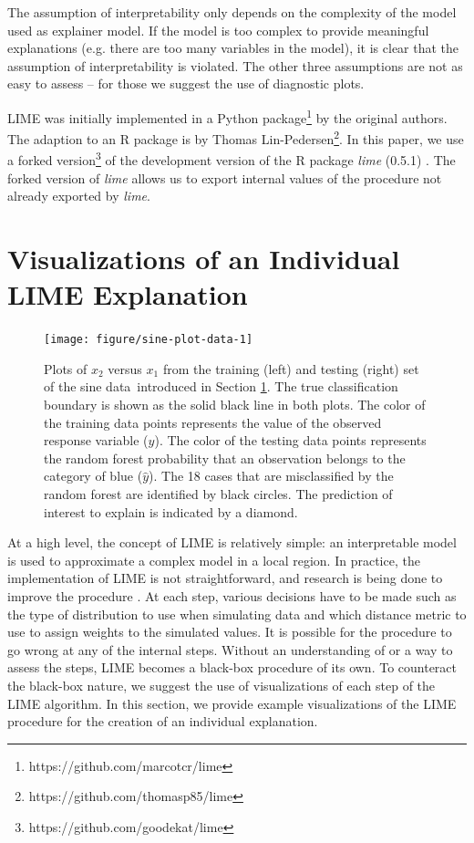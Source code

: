 \documentclass[AMS,STIX2COL]{WileyNJD-v2}\usepackage[]{graphicx}\usepackage[]{color}
\newenvironment{knitrout}{}{} %
\newcommand{\data}{sine data}
\begin{document}
The assumption of interpretability only depends on the complexity of the model used as explainer model. If the model is too complex to provide meaningful explanations (e.g. there are too many variables in the model), it is clear that the assumption of interpretability is violated. The other three assumptions are not as easy to assess -- for those we suggest the use of diagnostic plots. 

LIME was initially implemented in a Python package\footnote{https://github.com/marcotcr/lime} by the original authors. The adaption to an R package is by Thomas Lin-Pedersen\footnote{https://github.com/thomasp85/lime}. In this paper, we use a forked version\footnote{https://github.com/goodekat/lime} of the development version of the R package \emph{lime} (0.5.1) \citep{pedersen:2020}. The forked version of \emph{lime} allows us to export internal values of the procedure not already exported by \emph{lime}.

\section{Visualizations of an Individual LIME Explanation} \label{procedure}



\begin{figure}[!t]
\centering
\begin{knitrout}
\color{fgcolor}
\texttt{[image: figure/sine-plot-data-1]} 

\end{knitrout}
\caption{Plots of $x_2$ versus $x_1$ from the training (left) and testing (right) set of the \data \ introduced in Section \ref{procedure}. The true classification boundary is shown as the solid black line in both plots. The color of the training data points represents the value of the observed response variable ($y$). The color of the testing data points represents the random forest probability that an observation belongs to the category of blue ($\hat{y}$). The 18 cases that are misclassified by the random forest are identified by black circles. The prediction of interest to explain is indicated by a diamond.}
\label{fig:sine-plot-data}
\end{figure}

At a high level, the concept of LIME is relatively simple: an interpretable model is used to approximate a complex model in a local region. In practice, the implementation of LIME is not straightforward, and research is being done to improve the procedure \citep{laugel:2018}. At each step, various decisions have to be made such as the type of distribution to use when simulating data and which distance metric to use to assign weights to the simulated values. It is possible for the procedure to go wrong at any of the internal steps. Without an understanding of or a way to assess the steps, LIME becomes a black-box procedure of its own. To counteract the black-box nature, we suggest the use of visualizations of each step of the LIME algorithm. In this section, we provide example visualizations of the LIME procedure for the creation of an individual explanation.
\end{document}

